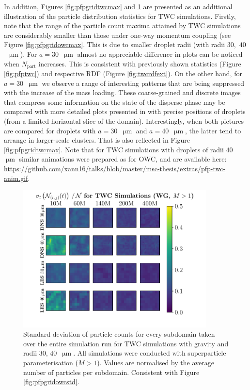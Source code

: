 \documentclass{pracamgren}
\begin{document}
\medskip

In addition, Figures \ref{fig:pfpgridtwcmax} and \ref{fig:pfpgridrdfstd} are presented as an additional illustration of the particle distribution statistics for TWC simulations.
Firstly, note that the range of the particle count maxima attained by TWC simulations are considerably smaller than those under one-way momentum coupling (see Figure \ref{fig:pfpgridowcmax}.
This is due to smaller droplet radii (with radii $30$,~$40$~$\upmu\text{m}$).
For $a = 30$~$\upmu\text{m}$ almost no appreciable difference in plots can be noticed when $N_{\text{part}}$ increases.
This is consistent with previously shown statistics (Figure \ref{fig:pfptwc}) and respective RDF (Figure \ref{fig:twcrdfext}).
On the other hand, for $a = 30$~$\upmu\text{m}$ we observe a range of interesting patterns that are being suppressed with the increase of the mass loading.
These coarse-grained and discrete images that compress some information on the state of the disperse phase may be compared with more detailed plots presented in \textcite[Figure 9bc]{Rosa2020} with precise positions of droplets (from a limited horizontal slice of the domain).
Interestingly, when both pictures are compared for droplets with $a = 30$~$\upmu\text{m}$ and $a = 40$~$\upmu\text{m}$, the latter tend to arrange in larger-scale clusters.
That is also reflected in Figure \ref{fig:pfpgridtwcmax}.
Note that for TWC simulations with droplets of radii $40$~$\upmu\text{m}$ similar animations were prepared as for OWC, and are available here: \url{https://github.com/xann16/talks/blob/master/msc-thesis/extras/pfp-twc-anim.gif}.

\begin{figure}[h]
\centering
\includegraphics[width=10cm]{img/plots/3-4j-pfpgridrdfstd.pdf}
\caption{
Standard deviation of particle counts for every subdomain taken over the entire simulation run for TWC simulations with gravity and radii $30$, $40$~$\upmu\text{m}$.
All simulations were conducted with superparticle parameterisation ($M>1$). 
Values are normalised by the average number of particles per subdomain.
Consistent with Figure \ref{fig:pfpgridowcstd}.
}
\label{fig:pfpgridrdfstd}
\end{figure}
\end{document}
